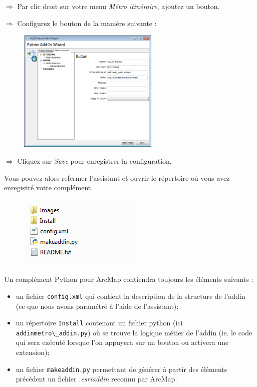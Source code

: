 \documentclass[11pt]{article}
\newcommand{\action}{$\Rightarrow$ }
\newcommand{\code}[1]{\lstinline{#1}}
\begin{document}
\action Par clic droit sur votre menu \textit{Métro itinéraire}, ajoutez un bouton.

\action Configurez le bouton de la manière suivante :
\begin{figure}[H]
	\center \includegraphics[width=0.6\textwidth]{img/td3/addin_assistant-4.png} \\
\end{figure}

\action Cliquez sur \textit{Save} pour enregistrer la configuration.

Vous pouvez alors refermer l'assistant et ouvrir le répertoire où vous avez enregistré votre complément.
\begin{figure}[H]
	\center \includegraphics{img/td3/addin_repertoire.png} \\
\end{figure}

Un complément Python pour ArcMap contiendra toujours les éléments suivants :
\begin{itemize}
	\item un fichier \code{config.xml} qui contient la description de la structure de l'addin (ce que nous avons paramétré à l'aide de l'assistant);
	\item un répertoire \code{Install} contenant un fichier python (ici \code{addinmetro\_addin.py}) où se trouve la logique métier de l'addin (ie. le code qui sera exécuté lorsque l'on appuyera sur un bouton ou activera une extension);
	\item un fichier \code{makeaddin.py} permettant de générer à partir des éléments précédent un fichier \textit{.esriaddin} reconnu par ArcMap.
\end{itemize}
\end{document}
